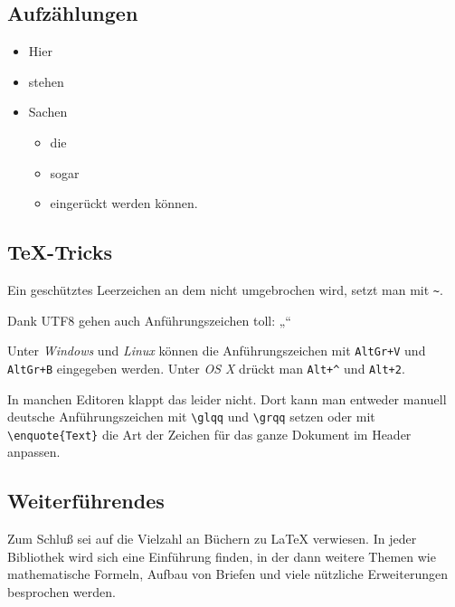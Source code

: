 \subsection{Aufzählungen}

\begin{itemize}
    \item  Hier
    \item  stehen
    \item  Sachen
    \begin{itemize}
        \item  die
        \item  sogar
        \item  eingerückt werden können.
    \end{itemize}
\end{itemize}


\subsection{TeX-Tricks}

Ein geschütztes Leerzeichen an dem nicht umgebrochen wird, setzt man mit \verb!~!.

Dank UTF8 gehen auch Anführungszeichen toll: „“

Unter \emph{Windows} und \emph{Linux} können die Anführungszeichen mit \texttt{AltGr+V} und \texttt{AltGr+B} eingegeben werden. Unter \emph{OS X} drückt man \texttt{Alt+\^{}} und \texttt{Alt+2}.

In manchen Editoren klappt das leider nicht. Dort kann man entweder manuell deutsche Anführungszeichen mit \verb!\glqq! und \verb!\grqq! setzen oder mit \verb!\enquote{Text}! die Art der Zeichen für das ganze Dokument im Header anpassen.


\subsection{Weiterführendes}

Zum Schluß sei auf die Vielzahl an Büchern zu \LaTeX{} verwiesen. In jeder Bibliothek wird sich eine Einführung finden, in der dann weitere Themen wie mathematische Formeln, Aufbau von Briefen und viele nützliche Erweiterungen besprochen werden.

